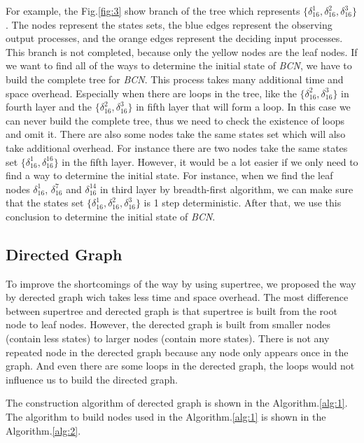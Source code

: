 For example, the Fig.\ref{fig:3} show branch of the tree which represents $\{\delta_{16}^1,\delta_{16}^2,\delta_{16}^3\}$. The nodes represent the states sets, the blue edges represent the observing output processes, and the orange edges represent the deciding input processes. This branch is not completed, because only the yellow nodes are the leaf nodes. If we want to find all of the ways to determine the initial state of {\em BCN}, we have to build the complete tree for {\em BCN}. This process takes many additional time and space overhead. Especially when there are loops in the tree, like the $\{\delta_{16}^2,\delta_{16}^3\}$ in fourth layer and the $\{\delta_{16}^2,\delta_{16}^3\}$ in fifth layer that will form a loop. In this case we can never build the complete tree, thus we need to check the existence of loops and omit it. There are also some nodes take the same states set which will also take additional overhead. For instance there are two nodes take the same states set $\{\delta_{16}^1,\delta_{16}^{16}\}$ in the fifth layer. However, it would be a lot easier if we only need to find a way to determine the initial state. For instance, when we find the leaf nodes $\delta_{16}^1$, $\delta_{16}^7$ and  $\delta_{16}^{14}$ in third layer by breadth-first algorithm, we can make sure that the states set $\{\delta_{16}^1,\delta_{16}^2,\delta_{16}^3\}$ is 1 step deterministic. After that, we use this conclusion to determine the initial state of {\em BCN}. 
\subsection{Directed Graph}
To improve the shortcomings of the way by using supertree, we proposed the way by derected graph wich takes less time and space overhead. The most difference between supertree and derected graph is that supertree is built from the root node to leaf nodes. However, the derected graph is built from smaller nodes (contain less states) to larger nodes (contain more states). There is not any repeated node in the derected graph because any node only appears once in the graph. And even there are some loops in the derected graph, the loops would not influence us to build the directed graph.

The construction algorithm of derected graph is shown in the Algorithm.\ref{alg:1}. The algorithm to build nodes used in the Algorithm.\ref{alg:1} is shown in the Algorithm.\ref{alg:2}.

